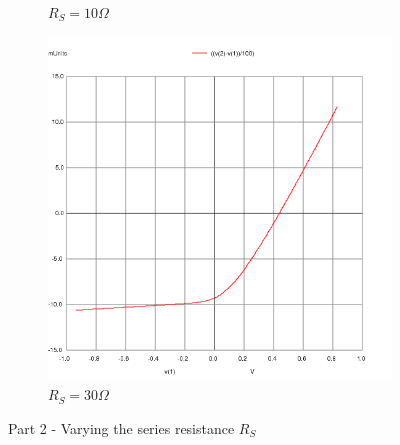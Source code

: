 \documentclass[12pt]{article}
\begin{document}
\begin{figure}[H]
\begin{subfigure}[b]{0.45\linewidth}
		\caption{\( R_S = 10 \Omega\)}
	\end{subfigure} 
	\begin{subfigure}[b]{0.45\linewidth}
		\includegraphics[width = \linewidth, trim = {0 0 0 0}, clip]{part2_rs30.png}
		\caption{\( R_S = 30 \Omega\)}
	\end{subfigure} 
	\caption{Part 2 - Varying the series resistance \( R_S \)}
\end{figure}
\end{document}

